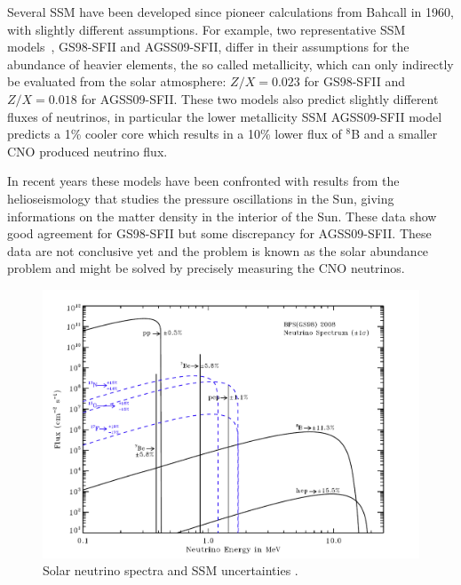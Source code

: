 
Several SSM have been developed since pioneer calculations from Bahcall in 1960, with slightly different assumptions. For example, two representative SSM models~\cite{serenelli}, GS98-SFII and AGSS09-SFII, differ in their assumptions for the abundance of heavier elements, the so called metallicity, which can only indirectly be evaluated from the solar atmosphere: $Z/X=0.023$ for GS98-SFII and $Z/X=0.018$ for AGSS09-SFII. These two models also predict slightly different fluxes of neutrinos, in particular the lower metallicity SSM AGSS09-SFII model predicts a 1\% cooler core which results in a 10\% lower flux of $^8$B and a smaller CNO produced neutrino flux.  

In recent years these models have been confronted with results from the helioseismology that studies the pressure oscillations in the Sun, giving informations on the matter density in the interior of the Sun.
These data show good agreement for GS98-SFII but some discrepancy for AGSS09-SFII. These data are not conclusive yet and the problem is known as the solar abundance problem and might be solved by precisely measuring the CNO neutrinos.

\begin{figure}[htbp]
\centering
\includegraphics[width=0.6\linewidth]{figures/nu_spectrum1.pdf}
  \caption{
Solar neutrino spectra and SSM uncertainties \cite{serenellif}. 
}
 \label{fig:sol-spectra}
 \end{figure}

